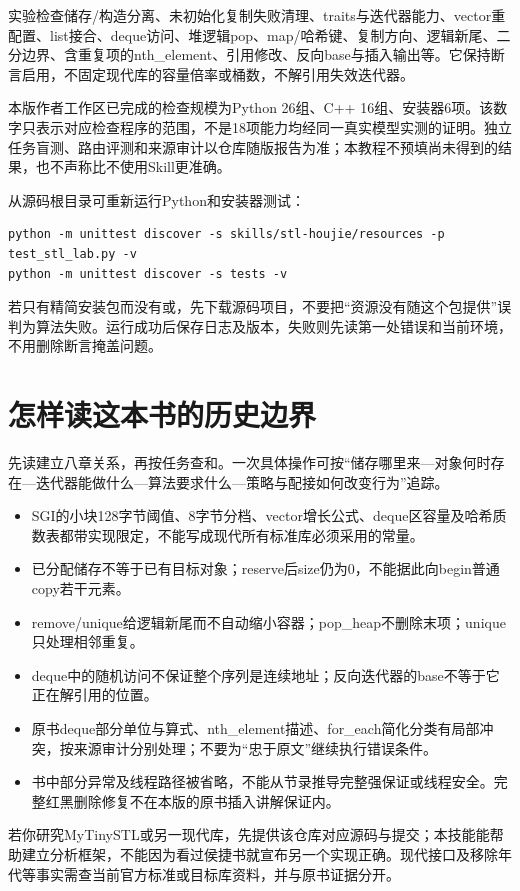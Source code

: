 \documentclass[11pt,a4paper,fontset=fandol]{ctexart}
\begin{document}
实验检查储存/构造分离、未初始化复制失败清理、traits与迭代器能力、vector重配置、list接合、deque访问、堆逻辑pop、map/哈希键、复制方向、逻辑新尾、二分边界、含重复项的nth\_element、引用修改、反向base与插入输出等。它保持断言启用，不固定现代库的容量倍率或桶数，不解引用失效迭代器。

本版作者工作区已完成的检查规模为Python 26组、C++ 16组、安装器6项。该数字只表示对应检查程序的范围，不是18项能力均经同一真实模型实测的证明。独立任务盲测、路由评测和来源审计以仓库随版报告为准；本教程不预填尚未得到的结果，也不声称比不使用Skill更准确。

从源码根目录可重新运行Python和安装器测试：
\begin{lstlisting}
python -m unittest discover -s skills/stl-houjie/resources -p test_stl_lab.py -v
python -m unittest discover -s tests -v
\end{lstlisting}
若只有精简安装包而没有或，先下载源码项目，不要把“资源没有随这个包提供”误判为算法失败。运行成功后保存日志及版本，失败则先读第一处错误和当前环境，不用删除断言掩盖问题。
\section{怎样读这本书的历史边界}
先读建立八章关系，再按任务查和。一次具体操作可按“储存哪里来—对象何时存在—迭代器能做什么—算法要求什么—策略与配接如何改变行为”追踪。

\begin{itemize}
\item SGI的小块128字节阈值、8字节分档、vector增长公式、deque区容量及哈希质数表都带实现限定，不能写成现代所有标准库必须采用的常量。
\item 已分配储存不等于已有目标对象；reserve后size仍为0，不能据此向begin普通copy若干元素。
\item remove/unique给逻辑新尾而不自动缩小容器；pop\_heap不删除末项；unique只处理相邻重复。
\item deque中的随机访问不保证整个序列是连续地址；反向迭代器的base不等于它正在解引用的位置。
\item 原书deque部分单位与算式、nth\_element描述、for\_each简化分类有局部冲突，按来源审计分别处理；不要为“忠于原文”继续执行错误条件。
\item 书中部分异常及线程路径被省略，不能从节录推导完整强保证或线程安全。完整红黑删除修复不在本版的原书插入讲解保证内。
\end{itemize}
若你研究MyTinySTL或另一现代库，先提供该仓库对应源码与提交；本技能能帮助建立分析框架，不能因为看过侯捷书就宣布另一个实现正确。现代接口及移除年代等事实需查当前官方标准或目标库资料，并与原书证据分开。
\end{document}
